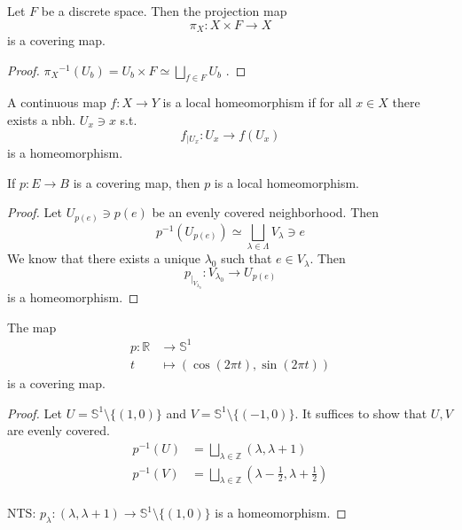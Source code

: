 \begin{example}
    Let \( F \) be a discrete space.
    Then the projection map
    \[
      \pi_X: X \times F \to X
    \]
    is a covering map.
\end{example}

\begin{proof}
  \( {\pi_X}^{-1}(U_b) = U_b \times F \simeq \bigsqcup_{f \in F} U_b  \) .
\end{proof}

\begin{definition}
    A continuous map \( f: X \to Y \) 
    is a local homeomorphism if 
    for all \( x \in X \) there exists
    a nbh. \( U_x \ni x \) s.t.
    \[
      f_{|U_x}: U_x \to f(U_x)
    \]
    is a homeomorphism.
\end{definition}

\begin{proposition}
   If \( p: E \to B \)  is a covering map,
   then \( p \) is a local homeomorphism.
\end{proposition}

\begin{proof}
  Let \( U_{p(e)} \ni p(e)  \) be an 
  evenly covered neighborhood.
  Then
  \[
    {p}^{-1} (U_{p(e)}) \simeq
    \bigsqcup_{\lambda \in \Lambda} V_\lambda \ni e
  \]
  We know that there exists a unique 
  \( \lambda_0 \) such that \( e \in V_\lambda \).
  Then
  \[
    p_{|_{V_{\lambda_0}}}: V_{\lambda_0} \longrightarrow U_{p(e)}
  \]
  is a homeomorphism.
\end{proof}

\begin{theorem}
    The map 
    \begin{align}
      p: \mathbb{R} &\to \mathbb{S}^1 \\
      t &\mapsto (\cos(2\pi t), \sin(2\pi t))
    \end{align}
    is a covering map.
\end{theorem}

\begin{proof}
    Let \( U = \mathbb{S}^1 \setminus \{ (1, 0) \}  \)
    and \( V = \mathbb{S}^1 \setminus \{ (-1, 0) \}  \).
    It suffices to show that
    \( U, V \) are evenly covered.
    \begin{align*}
      {p}^{-1} (U) &= \bigsqcup_{\lambda \in \mathbb{Z}} (\lambda, \lambda + 1) \\
      {p}^{-1} (V) &= \bigsqcup_{\lambda \in \mathbb{Z}} (\lambda - \frac{1}{2}, \lambda + \frac{1}{2}) \\
    \end{align*}

    NTS: \( p_\lambda: (\lambda, \lambda + 1) \to \mathbb{S}^1 \setminus \{ (1, 0) \}  \)
    is a homeomorphism.
\end{proof}

